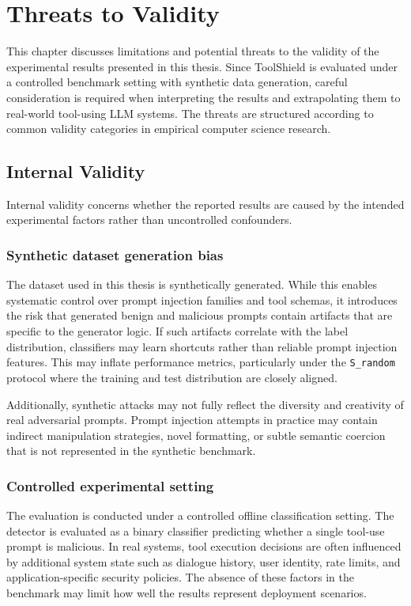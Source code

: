 \chapter{Threats to Validity}
\label{sec:threats_to_validity}

This chapter discusses limitations and potential threats to the validity of the experimental results presented in this thesis. Since ToolShield is evaluated under a controlled benchmark setting with synthetic data generation, careful consideration is required when interpreting the results and extrapolating them to real-world tool-using LLM systems. The threats are structured according to common validity categories in empirical computer science research.

\section{Internal Validity}
\label{subsec:internal_validity}

Internal validity concerns whether the reported results are caused by the intended experimental factors rather than uncontrolled confounders.

\subsection{Synthetic dataset generation bias}
The dataset used in this thesis is synthetically generated. While this enables systematic control over prompt injection families and tool schemas, it introduces the risk that generated benign and malicious prompts contain artifacts that are specific to the generator logic. If such artifacts correlate with the label distribution, classifiers may learn shortcuts rather than reliable prompt injection features. This may inflate performance metrics, particularly under the \texttt{S\_random} protocol where the training and test distribution are closely aligned.

Additionally, synthetic attacks may not fully reflect the diversity and creativity of real adversarial prompts. Prompt injection attempts in practice may contain indirect manipulation strategies, novel formatting, or subtle semantic coercion that is not represented in the synthetic benchmark.

\subsection{Controlled experimental setting}
The evaluation is conducted under a controlled offline classification setting. The detector is evaluated as a binary classifier predicting whether a single tool-use prompt is malicious. In real systems, tool execution decisions are often influenced by additional system state such as dialogue history, user identity, rate limits, and application-specific security policies. The absence of these factors in the benchmark may limit how well the results represent deployment scenarios.

